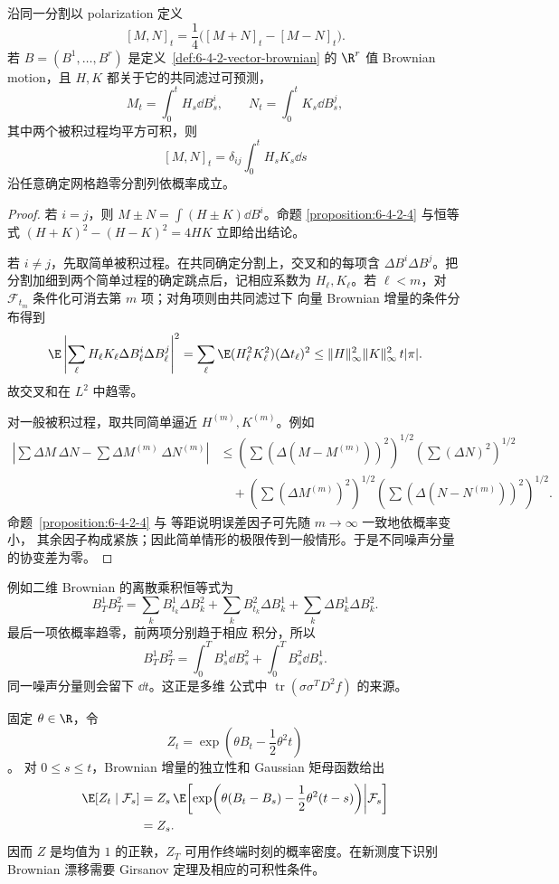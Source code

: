 \begin{proposition}\label{proposition:6-4-2-5}
沿同一分割以 polarization 定义
\[
 [M,N]_t=\frac14\bigl([M+N]_t-[M-N]_t\bigr).
\]
若 $B=(B^1,\ldots,B^r)$ 是定义~\ref{def:6-4-2-vector-brownian} 的
$\R^r$ 值 Brownian motion，且 $H,K$ 都关于它的共同滤过可预测，
\[
 M_t=\int_0^tH_s\dd B_s^i,
 \qquad N_t=\int_0^tK_s\dd B_s^j,
\]
其中两个被积过程均平方可积，则
\[
 [M,N]_t=\delta_{ij}\int_0^tH_sK_s\dd s
\]
沿任意确定网格趋零分割列依概率成立。
\end{proposition}

\begin{proof}
若 $i=j$，则 $M\pm N=\int(H\pm K)\dd B^i$。命题
\ref{proposition:6-4-2-4} 与恒等式
$(H+K)^2-(H-K)^2=4HK$ 立即给出结论。

若 $i\ne j$，先取简单被积过程。在共同确定分割上，交叉和的每项含
$\Delta B^i\Delta B^j$。把分割加细到两个简单过程的确定跳点后，记相应系数为
$H_\ell,K_\ell$。若 $\ell<m$，对 $\mathcal F_{t_m}$ 条件化可消去第 $m$ 项；对角项则由共同滤过下
向量 Brownian 增量的条件分布得到
\[
 \E\left|\sum_\ell H_\ell K_\ell
       \Delta B_\ell^i\Delta B_\ell^j\right|^2
 =\sum_\ell\E(H_\ell^2K_\ell^2)(\Delta t_\ell)^2
 \le\|H\|_\infty^2\|K\|_\infty^2\,t|\pi|.
\]
故交叉和在 $L^2$ 中趋零。

对一般被积过程，取共同简单逼近 $H^{(m)},K^{(m)}$。例如
\begin{align*}
 \left|\sum\Delta M\,\Delta N-\sum\Delta M^{(m)}\,\Delta N^{(m)}\right|
 &\le
 \left(\sum(\Delta(M-M^{(m)}))^2\right)^{1/2}
 \left(\sum(\Delta N)^2\right)^{1/2}\\
 &\quad+
 \left(\sum(\Delta M^{(m)})^2\right)^{1/2}
 \left(\sum(\Delta(N-N^{(m)}))^2\right)^{1/2}.
\end{align*}
命题~\ref{proposition:6-4-2-4} 与 \Ito{} 等距说明误差因子可先随 $m\to\infty$ 一致地依概率变小，
其余因子构成紧族；因此简单情形的极限传到一般情形。于是不同噪声分量的协变差为零。
\end{proof}

例如二维 Brownian 的离散乘积恒等式为
\[
 B_T^1B_T^2
 =\sum_kB_{t_k}^1\Delta B_k^2
  +\sum_kB_{t_k}^2\Delta B_k^1
  +\sum_k\Delta B_k^1\Delta B_k^2.
\]
最后一项依概率趋零，前两项分别趋于相应 \Ito{} 积分，所以
\[
 B_T^1B_T^2
 =\int_0^TB_s^1\dd B_s^2+\int_0^TB_s^2\dd B_s^1.
\]
同一噪声分量则会留下 $\dd t$。这正是多维 \Ito{} 公式中
$\operatorname{tr}(\sigma\sigma^TD^2f)$ 的来源。

\begin{remark}[指数鞅与终端密度]
固定 $\theta\in\R$，令
\[
 Z_t=\exp\!\left(\theta B_t-\frac12\theta^2t\right)
\]。
对 $0\le s\le t$，Brownian 增量的独立性和 Gaussian 矩母函数给出
\begin{align*}
 \E[Z_t\mid\mathcal F_s]
 &=Z_s\,\E\!\left[
   \exp\!\left(\theta(B_t-B_s)-\frac12\theta^2(t-s)\right)
   \middle|\mathcal F_s\right]\\
 &=Z_s.
\end{align*}
因而 $Z$ 是均值为 $1$ 的正鞅，$Z_T$ 可用作终端时刻的概率密度。在新测度下识别 Brownian 漂移需要
Girsanov 定理及相应的可积性条件。
\end{remark}

